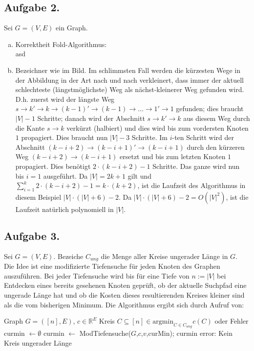 \documentclass[11pt,a4paper,ngerman]{article}
\newcommand{\argmin}{\text{argmin}}
\begin{document}
\subsection*{Aufgabe 2.}
Sei $G = (V,E)$ ein Graph.
\begin{enumerate}[a)]
\item Korrektheit Fold-Algorithmus: \\
asd
\item Bezeichner wie im Bild. Im schlimmsten Fall werden die kürzesten Wege in der Abbildung in der Art nach und nach verkleinert, dass immer der aktuell schlechteste (längstmöglichste) Weg als nächst-kleinerer Weg gefunden wird. D.h. zuerst wird der längste Weg $s \to k' \to k \to (k-1)' \to (k-1) \to \ldots \to 1' \to 1$ gefunden; dies braucht $|V|-1$ Schritte; danach wird der Abschnitt $s \to k' \to k$ aus diesem Weg durch die Kante $s \to k$ verkürzt (halbiert) und dies wird bis zum vordersten Knoten $1$ propagiert. Dies braucht nun $|V|-3$ Schritte. Im $i$-ten Schritt wird der Abschnitt $(k-i+2) \to (k-i+1)' \to (k-i+1)$ durch den kürzeren Weg $(k-i+2) \to (k-i+1)$ ersetzt und bis zum letzten Knoten $1$ propagiert. Dies benötigt $2 \cdot (k-i+2) -1$ Schritte. Das ganze wird nun bis $i = 1$ ausgeführt. Da $|V| = 2k+1$ gilt und $\sum_{i=1}^k 2 \cdot (k-i+2) -1 = k \cdot (k+2)$, ist die Laufzeit des Algorithmus in diesem Beispiel $|V| \cdot (|V| + 6) - 2$. Da $|V| \cdot (|V| + 6) - 2 = O(|V|^2)$, ist die Laufzeit natürlich polynomiell in $|V|$.
\end{enumerate}

\subsection*{Aufgabe 3.}
Sei $G = (V,E)$. Bezeiche $C_{ung}$ die Menge aller Kreise ungerader Länge in $G$. \\

Die Idee ist eine modifizierte Tiefensuche für jeden Knoten des Graphen auszuführen.
Bei jeder Tiefensuche wird bis für eine Tiefe von $n := |V|$ bei Entdecken eines bereits gesehenen Knoten geprüft, ob der aktuelle Suchpfad eine ungerade Länge hat und ob die Kosten dieses resultierenden Kreises kleiner sind als die vom bisherigen Minimum.
Die Algorithmus ergibt sich durch Aufruf von: \\

\begin{algorithmic}[1]
\Require Graph $G = ([n],E)$, $c \in \mathbb{R}^E$
\Ensure Kreis $C \subseteq [n] \in \argmin_{C \in C_{ung}} c(C)$ oder Fehler
\State curmin $\gets \emptyset$
\State curmin $\gets$ ModTiefensuche($G$,$c$,$v$,curMin);
\EndFor
{}
  \State \Return curmin
\Else
  \State \Return error: Kein Kreis ungerader Länge
\EndIf
\end{algorithmic}
\end{document}

